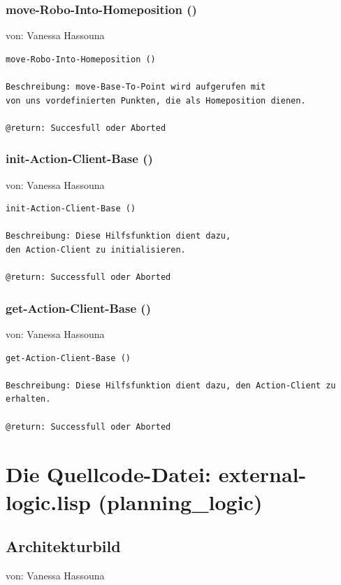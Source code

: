\documentclass{suturo}
\makeatletter
\newcommand{\chapterauthor}[1]{%
  {\parindent0pt\vspace*{-27pt}%
  \linespread{0}\small\begin{flushright}von: #1\end{flushright}%
  \par\nobreak\vspace*{0pt}}
  \@afterheading%
}
\makeatother
\begin{document}
\subsubsection{move-Robo-Into-Homeposition ()}
\chapterauthor{Vanessa Hassouna}
\begin{verbatim}
move-Robo-Into-Homeposition ()

Beschreibung: move-Base-To-Point wird aufgerufen mit 
von uns vordefinierten Punkten, die als Homeposition dienen.

@return: Succesfull oder Aborted
\end{verbatim}



\subsubsection{init-Action-Client-Base ()}
\chapterauthor{Vanessa Hassouna}
\begin{verbatim}
init-Action-Client-Base ()

Beschreibung: Diese Hilfsfunktion dient dazu, 
den Action-Client zu initialisieren.

@return: Successfull oder Aborted
\end{verbatim}

\subsubsection{get-Action-Client-Base ()}
\chapterauthor{Vanessa Hassouna}
\begin{verbatim}
get-Action-Client-Base ()

Beschreibung: Diese Hilfsfunktion dient dazu, den Action-Client zu erhalten.

@return: Successfull oder Aborted
\end{verbatim}





\section{Die Quellcode-Datei: external-logic.lisp (planning\_logic)}
\subsection{Architekturbild}
\chapterauthor{Vanessa Hassouna}
\end{document}
